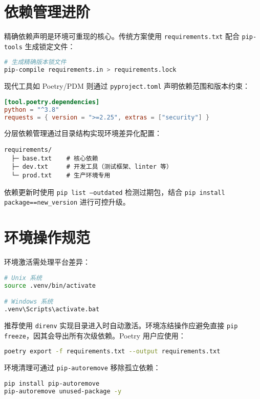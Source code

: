 \section{依赖管理进阶}
精确依赖声明是环境可重现的核心。传统方案使用 \texttt{requirements.txt} 配合 \texttt{pip-tools} 生成锁定文件：\par
\begin{lstlisting}[language=bash]
# 生成精确版本锁文件
pip-compile requirements.in > requirements.lock
\end{lstlisting}
现代工具如 Poetry/PDM 则通过 \texttt{pyproject.toml} 声明依赖范围和版本约束：\par
\begin{lstlisting}[language=toml]
[tool.poetry.dependencies]
python = "^3.8"
requests = { version = ">=2.25", extras = ["security"] }
\end{lstlisting}
分层依赖管理通过目录结构实现环境差异化配置：\par
\begin{lstlisting}
requirements/
  ├─ base.txt    # 核心依赖
  ├─ dev.txt     # 开发工具（测试框架、linter 等）
  └─ prod.txt    # 生产环境专用
\end{lstlisting}
依赖更新时使用 \texttt{pip list --outdated} 检测过期包，结合 \texttt{pip install package==new\_{}version} 进行可控升级。\par
\section{环境操作规范}
环境激活需处理平台差异：\par
\begin{lstlisting}[language=bash]
# Unix 系统
source .venv/bin/activate  

# Windows 系统
.venv\Scripts\activate.bat
\end{lstlisting}
推荐使用 \texttt{direnv} 实现目录进入时自动激活。环境冻结操作应避免直接 \texttt{pip freeze}，因其会导出所有次级依赖。Poetry 用户应使用：\par
\begin{lstlisting}[language=bash]
poetry export -f requirements.txt --output requirements.txt
\end{lstlisting}
环境清理可通过 \texttt{pip-autoremove} 移除孤立依赖：\par
\begin{lstlisting}[language=bash]
pip install pip-autoremove
pip-autoremove unused-package -y
\end{lstlisting}
